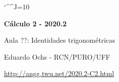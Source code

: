 \documentclass[oneside,12pt]{article}
\begin{document}
\catcode`\^^J=10

\pu

\long{}
\long{}
\long{}
\long{}
\long{}
\long{}
\long{}
\long{}
\long{}
\long{}
\long{}

\long{}
\long{}

\def\frown{\ensuremath{{=}{(}}}
\def\True {\mathbf{V}}
\def\False{\mathbf{F}}
\def\D    {\displaystyle}

\def\drafturl{http://angg.twu.net/LATEX/2020-2-C2.pdf}
\def\drafturl{http://angg.twu.net/2020.2-C2.html}
\def\draftfooter{\tiny \href{\drafturl}{\jobname{}} \ColorBrown{\shorttoday{} \hours}}



%

\thispagestyle{empty}

\begin{center}

\vspace*{1.2cm}

{\bf \Large Cálculo 2 - 2020.2}

\bsk

Aula ??: Identidades trigonométricas

\bsk

Eduardo Ochs - RCN/PURO/UFF

\url{http://angg.twu.net/2020.2-C2.html}

\end{center}
\end{document}
